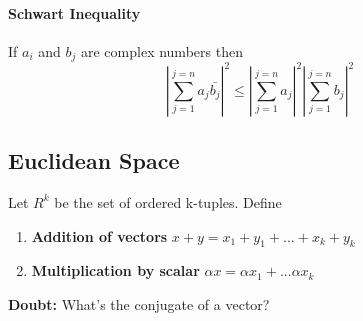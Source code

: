 \documentclass{article}
\begin{document}
	\paragraph{Schwart Inequality} If $a_i$ and $b_j$ are complex numbers then 
	\[| \sum_{j=1}^{j=n}a_j \bar{b_j}|^2 \leq |\sum_{j=1}^{j=n}a_j|^2 |\sum_{j=1}^{j=n}b_j|^2 \]

	\subsection{Euclidean Space}
	Let $R^k$ be the set of ordered k-tuples. Define
	\begin{enumerate}
		\item \textbf{Addition of vectors} $x+y = x_1+y_1 + ... + x_k+y_k$
		\item \textbf{Multiplication by scalar} $\alpha x = \alpha x_1 + ... \alpha x_k$
	\end{enumerate}
	
	\textbf{Doubt:} What's the conjugate of a vector?
\end{document}
